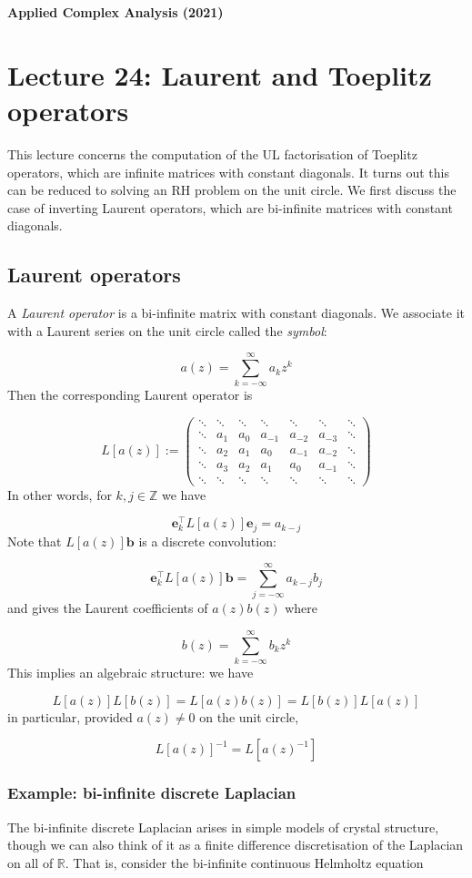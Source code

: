 \documentclass[12pt,a4paper]{article}
\def\R{ {\mathbb R} }
\def\Z{ {\mathbb Z} }
\def\vc#1{ {\mathbf #1} }
\def\sopmatrix#1{ \begin{pmatrix}#1\end{pmatrix} }
\begin{document}
\textbf{Applied Complex Analysis (2021)}

\section{Lecture 24: Laurent and Toeplitz operators}
This lecture concerns the computation of the UL factorisation of Toeplitz operators, which are infinite matrices with constant diagonals. It turns out this can be reduced to solving an RH problem on the unit circle.  We first discuss the case of inverting Laurent operators, which are bi-infinite matrices with constant diagonals.

\subsection{Laurent operators}
A \emph{Laurent operator} is a bi-infinite matrix with constant diagonals. We associate it with a Laurent series on the unit circle called the \emph{symbol}:

\[
a(z) = \sum_{k=-\infty}^\infty a_k z^k
\]
Then the corresponding Laurent operator is

\[
L[a(z)] := \sopmatrix{
\ddots & \ddots & \ddots& \ddots& \ddots& \ddots& \ddots \\
\ddots  & a_1 & a_0 & a_{-1} & a_{-2} & a_{-3} & \ddots \\
\ddots  & a_2 & a_1 & a_0 & a_{-1} & a_{-2} & \ddots \\
\ddots  & a_3 & a_2 & a_1 & a_0 & a_{-1} &  \ddots \\
\ddots & \ddots & \ddots& \ddots& \ddots& \ddots& \ddots
}
\]
In other words, for $k,j \in \Z$ we have

\[
\vc e_k^\top L[a(z)] \vc e_j = a_{k-j}
\]
Note that $L[a(z)] \vc b$ is a discrete convolution:

\[
\vc e_k^\top L[a(z)] \vc b = \sum_{j=-\infty}^\infty a_{k-j} b_j
\]
and gives the Laurent coefficients of $a(z) b(z)$ where

\[
b(z) = \sum_{k=-\infty}^\infty b_k z^k
\]
This implies an algebraic structure: we have

\[
L[a(z)] L[b(z)] = L[a(z)b(z)] = L[b(z)] L[a(z)]
\]
in particular, provided $a(z) \neq 0$ on the unit circle,

\[
L[a(z)]^{-1} = L[a(z)^{-1}]
\]
\subsubsection{Example: bi-infinite discrete Laplacian}
The bi-infinite discrete Laplacian arises in simple models of crystal structure, though we can also think of it as a finite difference discretisation of the Laplacian on all of $\R$. That is, consider the bi-infinite continuous Helmholtz equation
\end{document}
